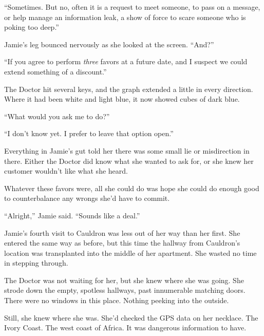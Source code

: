 ``Sometimes.  But no, often it is a request to meet someone, to pass on a message, or help manage an information leak, a show of force to scare someone who is poking too deep.''



Jamie's leg bounced nervously as she looked at the screen.  ``And?''



``If you agree to perform \emph{three} favors at a future date, and I suspect we could extend something of a discount.''



The Doctor hit several keys, and the graph extended a little in every direction.  Where it had been white and light blue, it now showed cubes of dark blue.



``What would you ask me to do?''



``I don't know yet.  I prefer to leave that option open.''



Everything in Jamie's gut told her there was some small lie or misdirection in there.  Either the Doctor did know what she wanted to ask for, or she knew her customer wouldn't like what she heard.



Whatever these favors were, all she could do was hope she could do enough good to counterbalance any wrongs she'd have to commit.



``Alright,'' Jamie said.  ``Sounds like a deal.''



\blacksquare



Jamie's fourth visit to Cauldron was less out of her way than her first.  She entered the same way as before, but this time the hallway from Cauldron's location was transplanted into the middle of her apartment.  She wasted no time in stepping through.



The Doctor was not waiting for her, but she knew where she was going.  She strode down the empty, spotless hallways, past innumerable matching doors.  There were no windows in this place.  Nothing peeking into the outside.



Still, she knew where she was.  She'd checked the GPS data on her necklace.  The Ivory Coast.  The west coast of Africa.  It was dangerous information to have.



